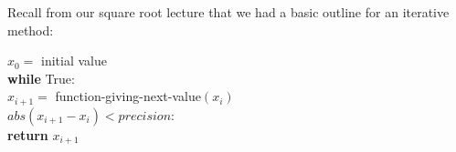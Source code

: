 \documentclass[titlepage]{tufte-book}
\begin{document}
\begin{fullwidth}
\begin{center}
\end{center}
 
\noindent Recall from our square root lecture that we had a basic outline for an iterative method:

\vspace{3mm}

$x_0 = $ initial value\\
{\bf while} True:\\
\hspace{4mm}$x_{i+1} = $ function-giving-next-value$(x_i)$\\
\hspace{4mm}{\bf if} $abs(x_{i+1} - x_i) < precision$:\\
{\bf return}  $x_{i+1}$\\


\end{fullwidth}
\end{document}
